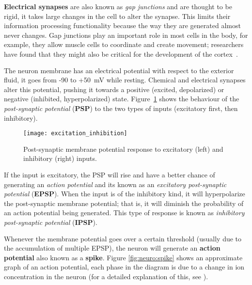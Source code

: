 \textbf{Electrical synapses} are also known as \emph{gap junctions} and are thought to be rigid, it takes large changes in the cell to alter the synapse. This limits their information processing functionality because the way they are generated almost never changes. Gap junctions play an important role in most cells in the body, for example, they allow muscle cells to coordinate and create movement; researchers have found that they might also be critical for the development of the cortex~\cite{gap-junctions-pmid20066080,thompson2000brain}. 

The neuron membrane has an electrical potential with respect to the exterior fluid, it goes from -90 to +50~mV while resting. Chemical and electrical synapses alter this potential, pushing it towards a positive (excited, depolarized) or negative (inhibited, hyperpolarized) state. Figure~\ref{fig:neuro:exc_inh} shows the behaviour of the \emph{post-synaptic potential} (\textbf{PSP}) to the two types of inputs (excitatory first, then inhibitory). 

\begin{figure}[hbt]
  \begin{center}
    \texttt{[image: excitation\_inhibition]}
    \caption{Post-synaptic membrane potential response to excitatory (left) and inhibitory (right) inputs.}
    \label{fig:neuro:exc_inh}
  \end{center}
\end{figure}

If the input is excitatory, the PSP will rise and have a better chance of generating an \emph{action potential} and its known as an \emph{excitatory post-synaptic potential} (\textbf{EPSP}). When the input is of the inhibitory kind, it will hyperpolarize the post-synaptic membrane potential; that is, it will diminish the probability of an action potential being generated. This type of response is known as \emph{inhibitory post-synaptic potential} (\textbf{IPSP}).

Whenever the membrane potential goes over a certain threshold (usually due to the accumulation of multiple EPSP), the neuron will generate an \textbf{action potential} also known as a \textbf{spike}. Figure \ref{fig:neuro:spike} shows an approximate graph of an action potential, each phase in the diagram is due to a change in ion concentration in the neuron (for a detailed explanation of this, see \cite{thompson2000brain}).

